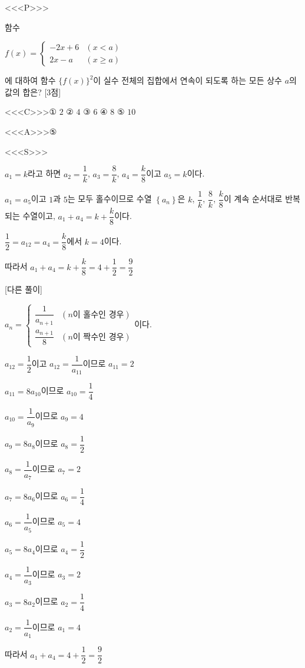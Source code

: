 \documentclass{oblivoir}
\begin{document}
<<<P>>>

함수 

$f(x)=\begin{cases}
-2x+6&(x< a)\\
2x-a&(x\ge a)
\end{cases}$

에 대하여 함수 $\{f(x)\}^{2}$이 실수 전체의 집합에서 연속이 되도록 하는 모든 상수 $a$의 값의 합은? [3점]

<<<C>>>① $2$ ② $4$ ③ $6$ ④ $8$ ⑤ $10$

<<<A>>>⑤

<<<S>>>

$a_{1}=k$라고 하면 $a_{2}=\dfrac{1}{k}$, $a_{3}=\dfrac{8}{k}$, $a_{4}=\dfrac{k}{8}$이고 $a_{5}=k$이다.

$a_{1}=a_{5}$이고 $1$과 $5$는 모두 홀수이므로 수열 $\left\{a_{n}\right\}$은 $k$, $\dfrac{1}{k}$, $\dfrac{8}{k}$, $\dfrac{k}{8}$이 계속 순서대로 반복되는 수열이고, $a_{1}+a_{4}=k +\dfrac{k}{8}$이다.

$\dfrac{1}{2}=a_{12}=a_{4}=\dfrac{k}{8}$에서 $k=4$이다.

따라서 $a_{1}+a_{4}=k +\dfrac{k}{8}=4+\dfrac{1}{2}=\dfrac{9}{2}$

[다른 풀이]

$a_{n}=\begin{cases}
\dfrac{1}{a_{n+1}}&(n \text{이 홀수인 경우})\\
\dfrac{a_{n+1}}{8}&(n \text{이 짝수인 경우})
\end{cases}$이다.

$a_{12}=\dfrac{1}{2}$이고 $a_{12}=\dfrac{1}{a_{11}}$이므로 $a_{11}=2$

$a_{11}=8a_{10}$이므로 $a_{10}=\dfrac{1}{4}$

$a_{10}=\dfrac{1}{a_{9}}$이므로 $a_{9}=4$

$a_{9}= 8a_{8}$이므로 $a_{8}=\dfrac{1}{2}$

$a_{8}=\dfrac{1}{a_{7}}$이므로 $a_{7}=2$

$a_{7}= 8a_{6}$이므로 $a_{6}=\dfrac{1}{4}$

$a_{6}=\dfrac{1}{a_{5}}$이므로 $a_{5}=4$

$a_{5}= 8a_{4}$이므로 $a_{4}=\dfrac{1}{2}$

$a_{4}=\dfrac{1}{a_{3}}$이므로 $a_{3}=2$

$a_{3}= 8a_{2}$이므로 $a_{2}=\dfrac{1}{4}$

$a_{2}=\dfrac{1}{a_{1}}$이므로 $a_{1}=4$

따라서 $a_{1}+a_{4}= 4+\dfrac{1}{2}=\dfrac{9}{2}$
\end{document}
